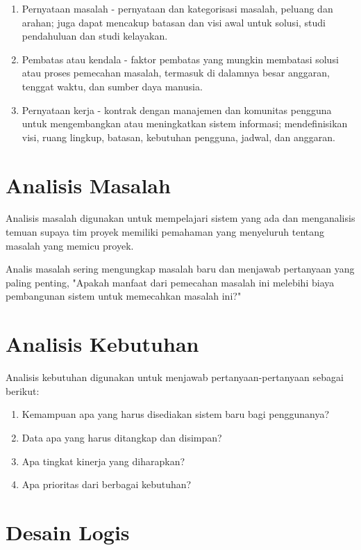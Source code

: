 \begin{enumerate}[itemsep=-1ex]
\item Pernyataan masalah - pernyataan dan kategorisasi masalah, peluang dan arahan; juga dapat mencakup batasan dan visi awal untuk solusi, studi pendahuluan dan studi kelayakan.

\item Pembatas atau kendala - faktor pembatas yang mungkin membatasi solusi atau proses pemecahan masalah, termasuk di dalamnya besar anggaran, tenggat waktu, dan sumber daya manusia.

\item Pernyataan kerja - kontrak dengan manajemen dan komunitas pengguna untuk mengembangkan atau meningkatkan sistem informasi; mendefinisikan visi, ruang lingkup, batasan, kebutuhan pengguna, jadwal, dan anggaran.
\end{enumerate}

\section{Analisis Masalah}

Analisis masalah digunakan untuk mempelajari sistem yang ada  dan menganalisis temuan supaya tim proyek memiliki pemahaman yang menyeluruh tentang masalah yang memicu proyek.

Analis masalah sering mengungkap masalah baru dan menjawab pertanyaan yang paling penting, "Apakah manfaat dari pemecahan masalah ini melebihi biaya pembangunan sistem untuk memecahkan masalah ini?"

\section{Analisis Kebutuhan}

Analisis kebutuhan digunakan untuk menjawab pertanyaan-pertanyaan sebagai berikut: 
\begin{enumerate}[itemsep=-1ex]
\item Kemampuan apa yang harus disediakan sistem baru bagi penggunanya? 
\item Data apa yang harus ditangkap dan disimpan? 
\item Apa tingkat kinerja yang diharapkan? 
\item Apa prioritas dari berbagai kebutuhan?
\end{enumerate}

\section{Desain Logis}

